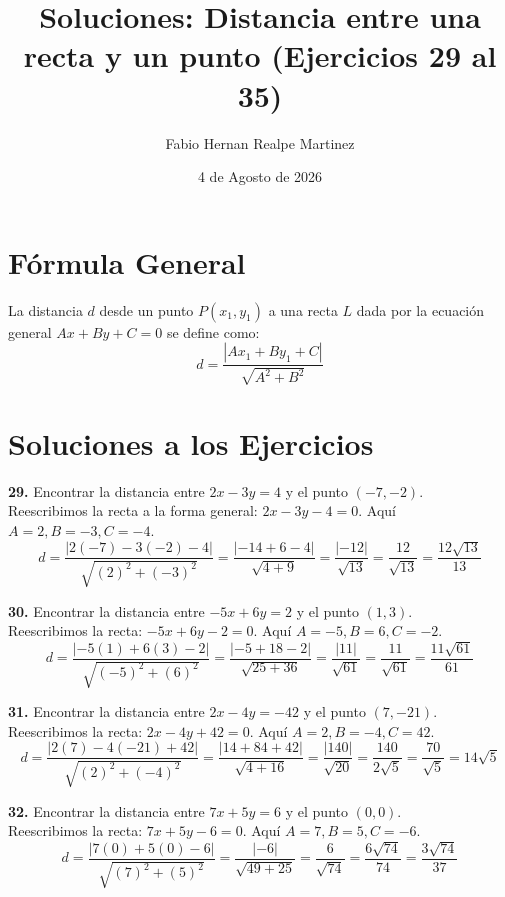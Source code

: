 \documentclass{article}
\title{Soluciones: Distancia entre una recta y un punto (Ejercicios 29 al 35)}
\author{Fabio Hernan Realpe Martinez}
\date{4 de Agosto de 2026}
\begin{document}
\maketitle

\section*{Fórmula General}
La distancia $d$ desde un punto $P(x_1, y_1)$ a una recta $L$ dada por la ecuación general $Ax + By + C = 0$ se define como:
\begin{equation}
    d = \frac{|Ax_1 + By_1 + C|}{\sqrt{A^2 + B^2}}
\end{equation}

\section*{Soluciones a los Ejercicios}

\textbf{29.} Encontrar la distancia entre $2x - 3y = 4$ y el punto $(-7, -2)$.\\
Reescribimos la recta a la forma general: $2x - 3y - 4 = 0$. Aquí $A=2, B=-3, C=-4$.
\[
d = \frac{|2(-7) - 3(-2) - 4|}{\sqrt{(2)^2 + (-3)^2}} = \frac{|-14 + 6 - 4|}{\sqrt{4 + 9}} = \frac{|-12|}{\sqrt{13}} = \frac{12}{\sqrt{13}} = \frac{12\sqrt{13}}{13}
\]

\vspace{0.5cm}
\textbf{30.} Encontrar la distancia entre $-5x + 6y = 2$ y el punto $(1, 3)$.\\
Reescribimos la recta: $-5x + 6y - 2 = 0$. Aquí $A=-5, B=6, C=-2$.
\[
d = \frac{|-5(1) + 6(3) - 2|}{\sqrt{(-5)^2 + (6)^2}} = \frac{|-5 + 18 - 2|}{\sqrt{25 + 36}} = \frac{|11|}{\sqrt{61}} = \frac{11}{\sqrt{61}} = \frac{11\sqrt{61}}{61}
\]

\vspace{0.5cm}
\textbf{31.} Encontrar la distancia entre $2x - 4y = -42$ y el punto $(7, -21)$.\\
Reescribimos la recta: $2x - 4y + 42 = 0$. Aquí $A=2, B=-4, C=42$.
\[
d = \frac{|2(7) - 4(-21) + 42|}{\sqrt{(2)^2 + (-4)^2}} = \frac{|14 + 84 + 42|}{\sqrt{4 + 16}} = \frac{|140|}{\sqrt{20}} = \frac{140}{2\sqrt{5}} = \frac{70}{\sqrt{5}} = 14\sqrt{5}
\]

\vspace{0.5cm}
\textbf{32.} Encontrar la distancia entre $7x + 5y = 6$ y el punto $(0, 0)$.\\
Reescribimos la recta: $7x + 5y - 6 = 0$. Aquí $A=7, B=5, C=-6$.
\[
d = \frac{|7(0) + 5(0) - 6|}{\sqrt{(7)^2 + (5)^2}} = \frac{|-6|}{\sqrt{49 + 25}} = \frac{6}{\sqrt{74}} = \frac{6\sqrt{74}}{74} = \frac{3\sqrt{74}}{37}
\]
\end{document}
